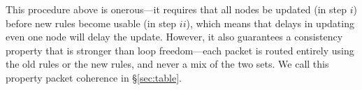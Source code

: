 

This procedure above is onerous---it requires that all nodes be updated (in step $i$) before new rules become usable (in step $ii$), which means that delays in updating even one node will delay the update. However, it also guarantees a consistency property that is stronger than loop freedom---each packet is routed entirely using the old rules or the new rules, and never a mix of the two sets. We call this property packet coherence in \S\ref{sec:table}.

